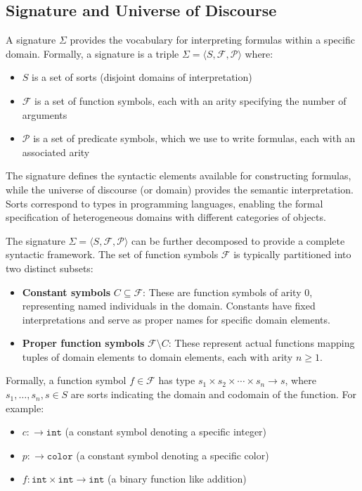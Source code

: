 \documentclass[11pt,a4paper]{article}
\theoremstyle{definition}
\theoremstyle{plain}
\theoremstyle{remark}
\begin{document}
\subsection{Signature and Universe of Discourse}

A signature $\Sigma$ provides the vocabulary for interpreting formulas within a specific domain. Formally, a signature is a triple $\Sigma = \langle S, \mathcal{F}, \mathcal{P} \rangle$ where:

\begin{itemize}
    \item $S$ is a set of sorts (disjoint domains of interpretation)
    \item $\mathcal{F}$ is a set of function symbols, each with an arity specifying the number of arguments
    \item $\mathcal{P}$ is a set of predicate symbols, which we use to write formulas, each with an associated arity
\end{itemize}

The signature defines the syntactic elements available for constructing formulas, while the universe of discourse (or domain) provides the semantic interpretation. Sorts correspond to types in programming languages, enabling the formal specification of heterogeneous domains with different categories of objects.

The signature $\Sigma = \langle S, \mathcal{F}, \mathcal{P} \rangle$ can be further decomposed to provide a complete syntactic framework. The set of function symbols $\mathcal{F}$ is typically partitioned into two distinct subsets:

\begin{itemize}
    \item \textbf{Constant symbols} $C \subseteq \mathcal{F}$: These are function symbols of arity 0, representing named individuals in the domain. Constants have fixed interpretations and serve as proper names for specific domain elements.

    \item \textbf{Proper function symbols} $\mathcal{F} \setminus C$: These represent actual functions mapping tuples of domain elements to domain elements, each with arity $n \geq 1$.
\end{itemize}

Formally, a function symbol $f \in \mathcal{F}$ has type $s_1 \times s_2 \times \cdots \times s_n \rightarrow s$, where $s_1, \dots, s_n, s \in S$ are sorts indicating the domain and codomain of the function. For example:
\begin{itemize}
    \item $c : \rightarrow \texttt{int}$ (a constant symbol denoting a specific integer)
    \item $p : \rightarrow \texttt{color}$ (a constant symbol denoting a specific color)
    \item $f : \texttt{int} \times \texttt{int} \rightarrow \texttt{int}$ (a binary function like addition)
\end{itemize}
\end{document}
